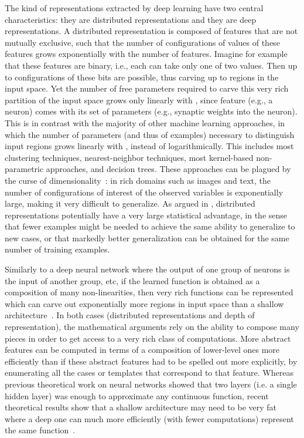 \documentclass[11pt]{article} %
\begin{document}
The kind of representations extracted by deep learning have two central
characteristics: they are distributed representations and they are deep
representations. A distributed representation is composed of features that
are not mutually exclusive, such that the number of configurations of
values of these features grows exponentially with the number of
features. Imagine for example that these features are binary, i.e., each
can take only one of two values. Then up to configurations of these bits
are possible, thus carving up to regions in the input space. Yet the number
of free parameters required to carve this very rich partition of the input
space grows only linearly with , since feature (e.g., a neuron) comes with
its set of parameters (e.g., synaptic weights into the neuron). This is in
contrast with the majority of other machine learning approaches, in which
the number of parameters (and thus of examples) necessary to distinguish
input regions grows linearly with , instead of logarithmically. This
includes most clustering techniques, nearest-neighbor techniques, most
kernel-based non-parametric approaches, and decision trees. These
approaches can be plagued by the curse of
dimensionality~\citep{Bengio-localfailure-NIPS-2006-small,Bengio-decision-trees10}:
in rich domains such as images and text, the number of configurations of
interest of the observed variables is exponentially large, making it very
difficult to generalize. As argued in \citet{Bengio-book-2009,Montufar+Morton-2014,Montufar-et-al-NIPS2014},
distributed representations potentially have a very large
statistical advantage, in the sense that fewer examples might be needed to
achieve the same ability to generalize to new cases, or that markedly
better generalization can be obtained for the same number of training
examples.


Similarly to a deep neural network where the output of one group of neurons
is the input of another group, etc, if the learned function is obtained as
a composition of many non-linearities, then very rich functions can be
represented which can carve out exponentially more regions in input space
than a shallow architecture~\citep{Montufar-et-al-NIPS2014}. In both cases (distributed
representations and depth of representation), the mathematical arguments
rely on the ability to compose many pieces in order to get access to a very
rich class of computations. More abstract features can be computed in terms
of a composition of lower-level ones more efficiently than if these
abstract features had to be spelled out more explicitly, by enumerating all
the cases or templates that correspond to that feature. Whereas previous
theoretical work on neural networks showed that two layers (i.e. a single
hidden layer) was enough to approximate any continuous function, recent
theoretical results show that a shallow architecture may need to be very
fat where a deep one can much more efficiently (with fewer computations)
represent the same function~\citep{Bengio+Delalleau-ALT-2011-small,Montufar-et-al-NIPS2014}.
\end{document}
